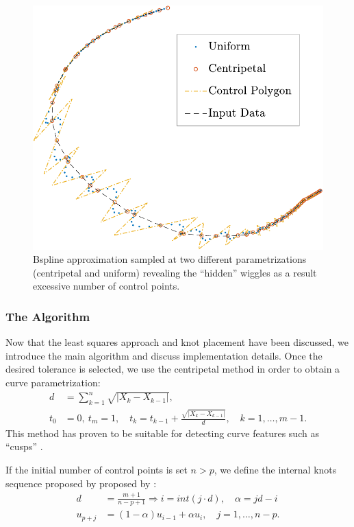 {\begin{figure}
  \includegraphics{wiggle_ALL-crop}
  \caption{\label{fig:bspline_wiggle}Bspline approximation sampled at two different parametrizations (centripetal and uniform) revealing the ``hidden'' wiggles as a result excessive number 
  of control points.}
 \end{figure}


\subsubsection{The Algorithm}
Now that the least squares approach and knot placement have been discussed, we introduce the main algorithm and discuss implementation 
details. Once the desired tolerance is selected, we use the centripetal method in order to obtain a curve parametrization: 
\begin{align}
 d &= \sum_{k=1}^n \sqrt {| X_k-X_{k-1}|},\\
 t_0 &=0,\ t_m=1,\quad t_k = t_{k-1} + \frac{\sqrt{|X_k-X_{k-1}|}}{d},\quad k = 1,\ldots, m-1.
 \end{align}
This method has proven to be suitable for detecting curve features such as ``cusps'' \cite{}. 
\begin{note}
 If the initial number of control points is set $n > p$, we define the internal knots sequence proposed by proposed by \cite{}: 
  \begin{align}
  d &= \frac{m+1}{n-p+1} \Rightarrow i = int(j\cdot d),\quad \alpha = jd -i\\
  u_{p+j} &= (1-\alpha)u_{i-1} + \alpha u_i,\quad j = 1,\ldots,n-p.
 \end{align}
\end{note}

}
